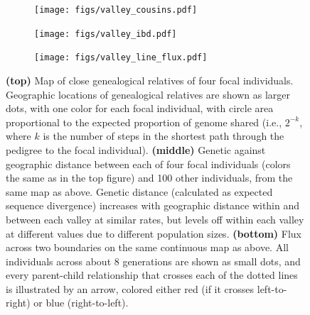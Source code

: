\documentclass{ar-1col}
\begin{document}
\begin{figure}[ht]
    \centering
    \begin{subfigure}{\textwidth}
        \centering
        \texttt{[image: figs/valley\_cousins.pdf]}
        \label{cousin_map}
    \end{subfigure}
    \begin{subfigure}{\textwidth}
        \centering
        \texttt{[image: figs/valley\_ibd.pdf]}
        \label{ibd}
    \end{subfigure}
    \begin{subfigure}{\textwidth}
        \centering
        \texttt{[image: figs/valley\_line\_flux.pdf]}
        \label{valleyflux}
    \end{subfigure}
        \caption{
            \textbf{(top)} Map of close genealogical relatives of four focal individuals.
            Geographic locations of 
            genealogical relatives are shown as larger dots, with one color for each focal individual,
            with circle area proportional to the expected proportion of genome shared
            (i.e., $2^{-k}$, where $k$ is the number of steps in the shortest path through the pedigree to the focal individual).
            \textbf{(middle)}
            Genetic against geographic distance between each of four focal individuals
            (colors the same as in the top figure)
            and 100 other individuals, from the same map as above.
            Genetic distance (calculated as expected sequence divergence)
            increases with geographic distance within and between each valley at similar rates,
            but levels off within each valley at different values
            due to different population sizes.
            \textbf{(bottom)}
            Flux across two boundaries on the same continuous map as above.
            All individuals across about 8 generations are shown as small dots,
            and every parent-child relationship that crosses each of the dotted lines
            is illustrated by an arrow, colored either red (if it crosses left-to-right) or blue (right-to-left).
        }
        \label{fig:dispersal}
\end{figure}




\end{document}
